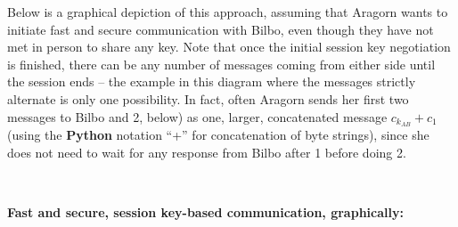\documentclass[12pt,letterpaper]{amsbook}
\theoremstyle{definition}
\theoremstyle{remark}
\numberwithin{figure}{section}
\numberwithin{exercise}{chapter}
\numberwithin{section}{chapter}
\numberwithin{equation}{section}
\numberwithin{table}{subsection}
\newcommand{\Python}{{\textbf{\ix{Python}}}}
\newcommand{\ix}[1]{{#1}\index{#1}}
\begin{document}
Below is a graphical depiction of this approach, assuming that Aragorn wants to
initiate fast and secure communication with Bilbo, even though they have not
met in person to share any key.  Note that once the initial session key negotiation is finished, there can be any number of messages coming
from either side until the session ends -- the example in this diagram where
the messages strictly alternate is only one possibility.  In fact, often Aragorn
sends her first two messages to Bilbo and
\textcircled{\tiny{2}}, below) as one, larger, concatenated  message
$c_{k_{AB}} + c_1$ (using the {\Python} notation ``+'' for concatenation of byte
strings), since she does not need to wait for any response from Bilbo
after \textcircled{\tiny{1}} before doing \textcircled{\tiny{2}}.

\ \vskip3mm

\centerline{\large\textbf{Fast and secure, session key-based communication, graphically:}}
\end{document}
